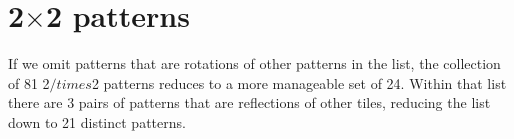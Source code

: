 \chapter{2$\times$2 patterns}

If we omit patterns that are rotations of other patterns in the list, the collection of 81 2$/times$2 patterns reduces to a more manageable set of 24. Within that list there are 3 pairs of patterns that are reflections of other tiles, reducing the list down to 21 distinct patterns.

\vspace{1cm}

